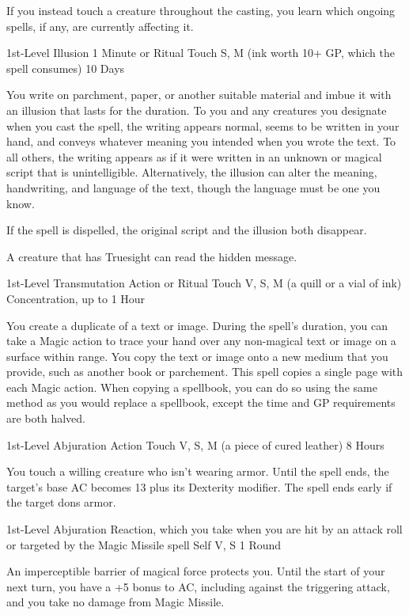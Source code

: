 \documentclass[letterpaper,openany,oneside,twocolumn]{book}
\begin{document}
If you instead touch a creature throughout the casting, you learn which ongoing spells, if any, are currently affecting it.

	{1st-Level Illusion}
	{1 Minute or Ritual}
	{Touch}
	{S, M (ink worth 10+ GP, which the spell consumes)}
	{10 Days}

You write on parchment, paper, or another suitable material and imbue it with an illusion that lasts for the duration. To you and any creatures you designate when you cast the spell, the writing appears normal, seems to be written in your hand, and conveys whatever meaning you intended when you wrote the text. To all others, the writing appears as if it were written in an unknown or magical script that is unintelligible. Alternatively, the illusion can alter the meaning, handwriting, and language of the text, though the language must be one you know.

If the spell is dispelled, the original script and the illusion both disappear.

A creature that has Truesight can read the hidden message.

	{1st-Level Transmutation}
	{Action or Ritual}
	{Touch}
	{V, S, M (a quill or a vial of ink)}
	{Concentration, up to 1 Hour}

You create a duplicate of a text or image. During the spell's duration, you can take a Magic action to trace your hand over any non-magical text or image on a surface within range. You copy the text or image onto a new medium that you provide, such as another book or parchement. This spell copies a single page with each Magic action. When copying a spellbook, you can do so using the same method as you would replace a spellbook, except the time and GP requirements are both halved.

	{1st-Level Abjuration}
	{Action}
	{Touch}
	{V, S, M (a piece of cured leather)}
	{8 Hours}

You touch a willing creature who isn't wearing armor. Until the spell ends, the target's base AC becomes 13 plus its Dexterity modifier. The spell ends early if the target dons armor.

	{1st-Level Abjuration}
	{Reaction, which you take when you are hit by an attack roll or targeted by the Magic Missile spell}
	{Self}
	{V, S}
	{1 Round}

An imperceptible barrier of magical force protects you. Until the start of your next turn, you have a +5 bonus to AC, including against the triggering attack, and you take no damage from Magic Missile.
\end{document}
